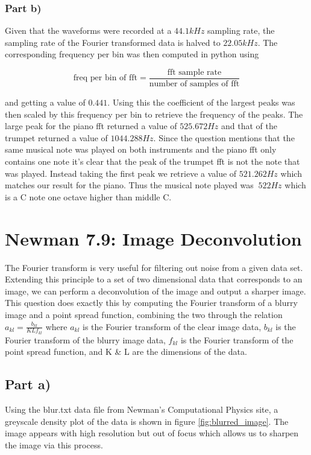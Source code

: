 \documentclass{article}
\begin{document}
\subsubsection{Part b)}
Given that the waveforms were recorded at a $44.1kHz$ sampling rate, the sampling rate of the Fourier transformed data is halved to $22.05kHz$. The corresponding frequency per bin was then computed in python using

\begin{equation}
	\text{freq per bin of fft} = \frac{\text{fft sample rate}}{\text{number of samples of fft}}
\end{equation}

and getting a value of $0.441$. Using this the coefficient of the largest peaks was then scaled by this frequency per bin to retrieve the frequency of the peaks. The large peak for the piano fft returned a value of $525.672Hz$ and that of the trumpet returned a value of $1044.288Hz$. Since the question mentions that the same musical note was played on both instruments and the piano fft only contains one note it's clear that the peak of the trumpet fft is not the note that was played. Instead taking the first peak we retrieve a value of $521.262Hz$ which matches our result for the piano. Thus the musical note played was $~522Hz$ which is a C note one octave higher than middle C.


\section{Newman 7.9: Image Deconvolution}
The Fourier transform is very useful for filtering out noise from a given data set. Extending this principle to a set of two dimensional data that corresponds to an image, we can perform a deconvolution of the image and output a sharper image. This question does exactly this by computing the Fourier transform of a blurry image and a point spread function, combining the two through the relation $a_{kl} = \frac{b_{kl}}{KLf_{kl}}$ where $a_{kl}$ is the Fourier transform of the clear image data, $b_{kl}$ is the Fourier transform of the blurry image data, $f_{kl}$ is the Fourier transform of the point spread function, and K \& L are the dimensions of the data.

\subsection{Part a)}
Using the blur.txt data file from Newman's Computational Physics site, a greyscale density plot of the data is shown in figure \ref{fig:blurred_image}. The image appears with high resolution but out of focus which allows us to sharpen the image via this process.
\end{document}
